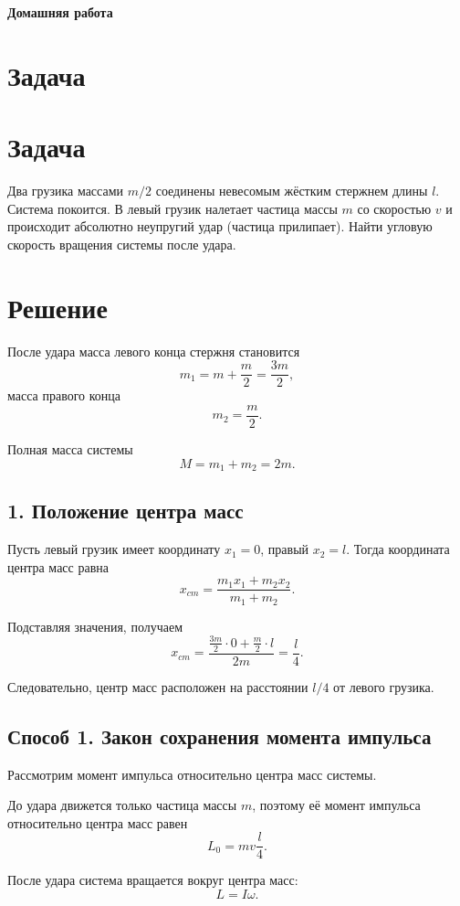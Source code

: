 \documentclass[a4paper,12pt]{article}
\begin{document}
\begin{center}
    \textbf{Домашняя работа }
\end{center}
\section*{Задача}

\section*{Задача}

Два грузика массами $m/2$ соединены невесомым жёстким стержнем длины $l$.
Система покоится. В левый грузик налетает частица массы $m$
со скоростью $v$ и происходит абсолютно неупругий удар (частица
прилипает). Найти угловую скорость вращения системы после удара.

\section*{Решение}

После удара масса левого конца стержня становится
\[
m_1=m+\frac{m}{2}=\frac{3m}{2},
\]
масса правого конца
\[
m_2=\frac{m}{2}.
\]

Полная масса системы
\[
M=m_1+m_2=2m.
\]

\subsection*{1. Положение центра масс}

Пусть левый грузик имеет координату $x_1=0$, правый $x_2=l$.
Тогда координата центра масс равна
\[
x_{cm}=\frac{m_1x_1+m_2x_2}{m_1+m_2}.
\]

Подставляя значения, получаем
\[
x_{cm}=
\frac{\frac{3m}{2}\cdot0+\frac{m}{2}\cdot l}{2m}
=\frac{l}{4}.
\]

Следовательно, центр масс расположен на расстоянии $l/4$
от левого грузика.

\subsection*{Способ 1. Закон сохранения момента импульса}

Рассмотрим момент импульса относительно центра масс системы.

До удара движется только частица массы $m$,
поэтому её момент импульса относительно центра масс равен
\[
L_0=m v \frac{l}{4}.
\]

После удара система вращается вокруг центра масс:
\[
L=I\omega .
\]
\end{document}
